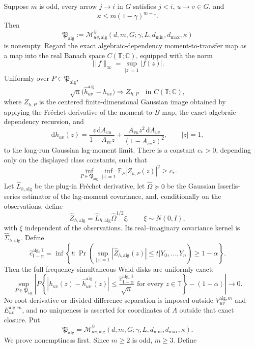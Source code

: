 Suppose \(m\) is odd, every arrow \(j\to i\) in \(G\) satisfies \(j<i\), \(u\to v\in G\), and
\[
 \kappa\le m(1-\gamma)^{m-1}.
\]
Then
\[
 \mathfrak P_{\mathrm{alg}}
 :=\mathcal M_{uv,\mathrm{alg}}^{\partial}
 (d,m,G;\gamma,L,d_{\min},d_{\max},\kappa)
\]
is nonempty.  Regard the exact algebraic-dependency moment-to-transfer map as a map into the real Banach space \(C(\mathbb T;\mathbb C)\), equipped with the norm
\[
 \|f\|_{\infty}=\sup_{|z|=1}|f(z)|.
\]
Uniformly over \(P\in\mathfrak P_{\mathrm{alg}}\),
\[
 \sqrt n\bigl(\widehat h_{uv}^{\mathrm{alg}}-h_{uv}\bigr)
 \Longrightarrow Z_{h,P}
 \quad\text{in }C(\mathbb T;\mathbb C),
\]
where \(Z_{h,P}\) is the centered finite-dimensional Gaussian image obtained by applying the Fr\'echet derivative of the moment-to-\(B\) map, the exact algebraic-dependency recursion, and
\[
 \mathrm dh_{uv}(z)
 =\frac{z\,\mathrm dA_{vu}}{1-A_{vv}z}
  +\frac{A_{vu}z^2\,\mathrm dA_{vv}}{(1-A_{vv}z)^2},
 \qquad |z|=1,
\]
to the long-run Gaussian lag-moment limit.  There is a constant \(c_*>0\), depending only on the displayed class constants, such that
\[
 \inf_{P\in\mathfrak P_{\mathrm{alg}}}
 \inf_{|z|=1}\mathbb E_P|Z_{h,P}(z)|^2\ge c_*.
\]
Let \(\widehat L_{h,\mathrm{alg}}\) be the plug-in Fr\'echet derivative, let \(\widehat\Omega\succeq0\) be the Gaussian Isserlis-series estimator of the lag-moment covariance, and, conditionally on the observations, define
\[
 \widehat Z_{h,\mathrm{alg}}
 =\widehat L_{h,\mathrm{alg}}\widehat\Omega^{1/2}\xi,
 \qquad \xi\sim N(0,I),
\]
with \(\xi\) independent of the observations.  Its real--imaginary covariance kernel is \(\widehat\Sigma_{h,\mathrm{alg}}\).  Define
\[
 \widehat c_{1-\alpha}^{\mathrm{alg},\mathbb T}
 =\inf\left\{t:
 \Pr\!\left(
  \sup_{|z|=1}|\widehat Z_{h,\mathrm{alg}}(z)|\le t
  \mathrel{\big|}Y_0,\ldots,Y_n
 \right)\ge1-\alpha\right\}.
\]
Then the full-frequency simultaneous Wald disks are uniformly exact:
\[
 \sup_{P\in\mathfrak P_{\mathrm{alg}}}
 \left|
 P\!\left\{
  |h_{uv}(z)-\widehat h_{uv}^{\mathrm{alg}}(z)|
  \le\frac{\widehat c_{1-\alpha}^{\mathrm{alg},\mathbb T}}{\sqrt n}
  \text{ for every }z\in\mathbb T
 \right\}-(1-\alpha)
 \right|\longrightarrow0.
\]
No root-derivative or divided-difference separation is imposed outside \(V_{uv}^{\mathrm{alg},m}\) and \(E_{uv}^{\mathrm{alg},m}\), and no uniqueness is asserted for coordinates of \(A\) outside that exact closure.
Put
\[
 \mathfrak P_{\mathrm{alg}}
 =\mathcal M_{uv,\mathrm{alg}}^{\partial}
 (d,m,G;\gamma,L,d_{\min},d_{\max},\kappa).
\tag{1}
\]
We prove nonemptiness first.  Since \(m\ge2\) is odd, \(m\ge3\).  Define
